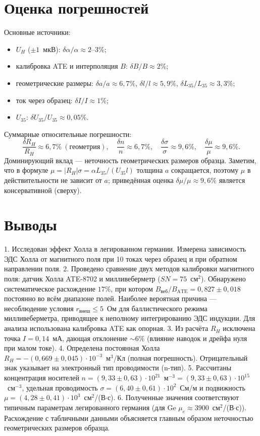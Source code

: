 \documentclass[a4paper,12pt]{article}
\begin{document}
\section{Оценка погрешностей}
Основные источники:
\begin{itemize}
    \item \(U_H\) (\(\pm1\)~мкВ): \(\delta\alpha/\alpha \approx 2\text{--}3\%\);
    \item калибровка ATE и интерполяция \(B\): \(\delta B/B \approx 2\%\);
    \item геометрические размеры: \(\delta a/a \approx 6{,}7\%\), \(\delta l/l \approx 5{,}9\%\), \(\delta L_{35}/L_{35} \approx 3{,}3\%\);
    \item ток через образец: \(\delta I/I \approx 1\%\);
    \item \(U_{35}\): \(\delta U_{35}/U_{35} \approx 0{,}05\%\).
\end{itemize}
Суммарные относительные погрешности:
\[
    \frac{\delta R_H}{R_H} \approx 6{,}7\%\ (\text{геометрия}),\quad
    \frac{\delta n}{n} \approx 6{,}7\%,\quad
    \frac{\delta\sigma}{\sigma} \approx 9{,}6\%,\quad
    \frac{\delta\mu}{\mu} \approx 9{,}6\%.
\]
Доминирующий вклад --- неточность геометрических размеров образца. Заметим, что в формуле \(\mu = |R_H|\sigma = \alpha L_{35}/(U_{35} l)\) толщина \(a\) сокращается, поэтому \(\mu\) в действительности не зависит от \(a\); приведённая оценка \(\delta\mu/\mu \approx 9{,}6\%\) является консервативной (сверху).

\section{Выводы}
1. Исследован эффект Холла в легированном германии. Измерена зависимость ЭДС Холла от магнитного поля при 10 токах через образец и при обратном направлении поля.
2. Проведено сравнение двух методов калибровки магнитного поля: датчик Холла ATE-8702 и милливеберметр (\(SN = 75\)~см$^2$). Обнаружено систематическое расхождение \(17\%\), при котором \(B_\text{веб}/B_\text{ATE} = 0{,}827 \pm 0{,}018\) постоянно во всём диапазоне полей. Наиболее вероятная причина --- несоблюдение условия \(r_\text{внеш} \le 5\)~Ом для баллистического режима милливеберметра, приводящее к неполному интегрированию ЭДС индукции. Для анализа использована калибровка ATE как опорная.
3. Из расчёта \(R_H\) исключена точка \(I = 0{,}14\)~мА, дающая отклонение \(\sim6\%\) (влияние наводок и дрейфа нуля при малом токе).
4. Определена постоянная Холла \(R_H = -(0{,}669 \pm 0{,}045)\cdot 10^{-3}\)~м$^3$/Кл (полная погрешность). Отрицательный знак указывает на электронный тип проводимости (n-тип).
5. Рассчитаны концентрация носителей \(n = (9{,}33 \pm 0{,}63)\cdot 10^{21}\)~м$^{-3} = (9{,}33 \pm 0{,}63)\cdot 10^{15}$~см$^{-3}$, удельная проводимость \(\sigma = (6{,}40 \pm 0{,}61)\cdot 10^{2}\)~См/м и подвижность \(\mu = (4{,}28 \pm 0{,}41)\cdot 10^{3}\)~см$^2$/(В$\cdot$с).
6. Полученные значения соответствуют типичным параметрам легированного германия (для Ge \(\mu_e \approx 3900\)~см$^2$/(В$\cdot$с)). Расхождение с табличными данными объясняется главным образом неточностью геометрических размеров образца.
\end{document}
